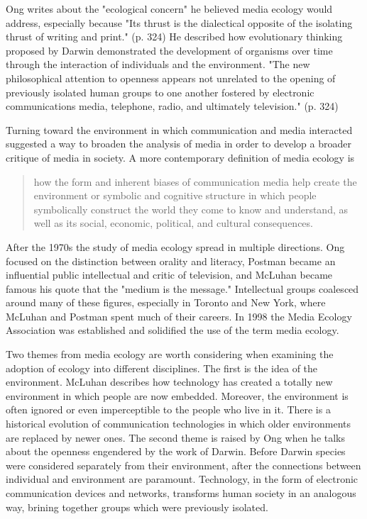 Ong writes about the "ecological concern" he believed media ecology would address, especially because "Its thrust is the dialectical opposite of the isolating thrust of writing and print." (p. 324) He described how evolutionary thinking proposed by Darwin demonstrated the development of organisms over time through the interaction of individuals and the environment. "The new philosophical attention to openness appears not unrelated to the opening of previously isolated human groups to one another fostered by electronic communications media, telephone, radio,
and ultimately television."\citep{ong_interfaces_1977} (p. 324)

Turning toward the environment in which communication and media interacted suggested a way to broaden the analysis of media in order to develop a broader critique of media in society. A more contemporary definition of media ecology is

\begin{quote}
how the form and inherent biases of communication media help create the environment or symbolic and cognitive structure in which people symbolically construct the world they come to know and understand, as well as its social, economic, political, and cultural consequences. \citep{lum_introduction:_2000}
\end{quote}

After the 1970s the study of media ecology spread in multiple directions. Ong focused on the distinction between orality and literacy, Postman became an influential public intellectual and critic of television, and McLuhan became famous his quote that the "medium is the message." Intellectual groups coalesced around many of these figures, especially in Toronto and New York, where McLuhan and Postman spent much of their careers. In 1998 the Media Ecology Association was established and solidified the use of the term media ecology. 

Two themes from media ecology are worth considering when examining the adoption of ecology into different disciplines. The first is the idea of the environment. McLuhan describes how technology has created a totally new environment in which people are now embedded. Moreover, the environment is often ignored or even imperceptible to the people who live in it. There is a historical evolution of communication technologies in which older environments are replaced by newer ones. The second theme is raised by Ong when he talks about the openness engendered by the work of Darwin. Before Darwin species were considered separately from their environment, after the connections between individual and environment are paramount. Technology, in the form of electronic communication devices and networks, transforms human society in an analogous way, brining together groups which were previously isolated.

